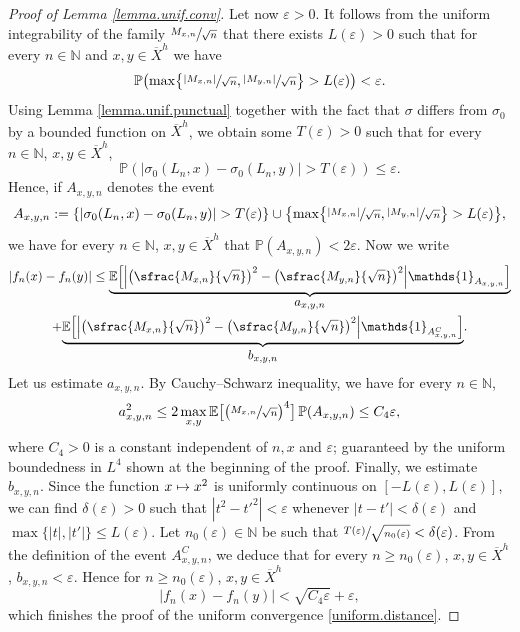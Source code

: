\documentclass[10pt]{amsart}
\newcommand\mto{\mathchoice{\longmapsto}{\mapsto}{\mapsto}{\mapsto}}
\let\epsilon\varepsilon
\let\ts\textstyle
\theoremstyle{plain}
\theoremstyle{definition}
\newcommand\E{\mathbb{E}}
\newcommand\p{\mathbb{P}}
\newcommand\N{\mathbb{N}}
\begin{document}
\begin{proof}[Proof of Lemma \ref{lemma.unif.conv}]
Let now $\epsilon>0$. It follows from the uniform integrability of the family $\sfrac{M_{x,n}}{\sqrt{n}}$ that there exists $L(\epsilon)>0$ such that for every $n\in \N$ and $x,y\in \overline{X}^h$ we have
\[
\p\bigl(\max\bigl\{\sfrac{|M_{x,n}|}{\sqrt{n}}, \sfrac{|M_{y,n}|}{\sqrt{n}}\bigr\}>L(\epsilon)\bigr)<\epsilon.
\]
Using Lemma \ref{lemma.unif.punctual} together with the fact that $\sigma$ differs from $\sigma_0$ by a bounded function on $\overline{X}^h$, we obtain some $T(\epsilon)>0$ such that for every $n\in \N$, $x,y\in \overline{X}^h$,
\begin{equation}\label{eq.botim1}
\p(|\sigma_0(L_n, x)-\sigma_0(L_n,y)|>T(\epsilon))\leq \epsilon.
\end{equation}
Hence, if $A_{x,y,n}$ denotes the event
\[
A_{x,y,n}:= \left\{|\sigma_0(L_n, x)-\sigma_0(L_n, y)|>T(\epsilon) \right\} \cup \bigl\{\max\bigl\{\sfrac{|M_{x,n}|}{\sqrt{n}}, \sfrac{|M_{y,n}|}{\sqrt{n}}\bigr\}> L(\epsilon)\bigr\},
\]
we have for every $n\in \N$, $x,y\in \overline{X}^h$ that
$\p(A_{x,y,n})<2\epsilon$. Now we write
\begin{multline*}
|f_n(x)-f_n(y)|\leq \underset{\ts a_{x,y,n}}{\underbrace{ \E\Bigl[\Bigl|\bigl(\sfrac{M_{x,n}}{\sqrt{n}}\bigr)^2 - \bigl(\sfrac{M_{y,n}}{\sqrt{n}}\bigr)^2\Bigr|\mathds{1}_{A_{x,y,n}}\Bigr]}}\\
+ \underset{\ts b_{x,y,n}}{\underbrace{ \E\Bigl[\Bigl|\bigl(\sfrac{M_{x,n}}{\sqrt{n}}\bigr)^2 - \bigl(\sfrac{M_{y,n}}{\sqrt{n}}\bigr)^2\Bigr|\mathds{1}_{A_{x,y,n}^C}\Bigr]}}.
\end{multline*}
Let us estimate $a_{x,y,n}$. By Cauchy--Schwarz inequality, we have for every $n\in \N$,
\[
a_{x,y,n}^2 \leq 2\max_{x,y}{\E\bigl[\bigl(\sfrac{M_{x,n}}{\sqrt{n}}\bigr)^4\bigr]} \,\p(A_{x,y,n})\leq C_4\epsilon,
\]
where $C_4>0$ is a constant independent of $n, x$ and $\epsilon$; guaranteed by the uniform boundedness in $L^4$ shown at the beginning of the proof. Finally, we estimate $b_{x,y,n}$. Since the function $x\mto x^2$ is uniformly continuous on $[-L(\epsilon), L(\epsilon)]$, we can find $\delta(\epsilon)>0$ such that $|t^2-t'^2|<\epsilon$ whenever $|t-t'|<\delta(\epsilon)$ and $\max\{|t|,|t'|\}\leq L(\epsilon)$. Let $n_0(\epsilon)\in \N$ be such that $\sfrac{T(\epsilon)}{\sqrt{n_0(\epsilon)}}<\delta(\epsilon)$. From the definition of the event $A_{x,y,n}^C$, we deduce that for every $n\geq n_0(\epsilon)$, $x,y\in \overline{X}^h$, $b_{x,y,n}<\epsilon$.
Hence for $n\geq n_0(\epsilon)$, $x,y\in \overline{X}^h$
\[
|f_n(x)-f_n(y)|< \sqrt{C_4 \epsilon}+\epsilon,
\]
which finishes the proof of the uniform convergence \eqref{uniform.distance}. \end{proof}
\end{document}
